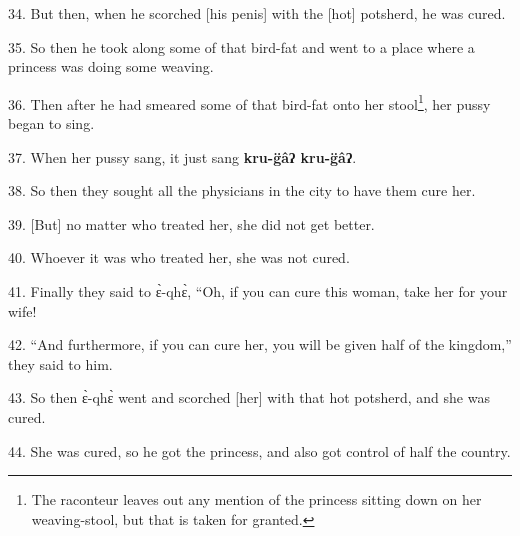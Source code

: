 34. But then, when he scorched [his penis] with the [hot] potsherd, he was cured.

35. So then he took along some of that bird-fat and went to a place where a princess
was doing some weaving.

36. Then after he had smeared some of that bird-fat onto her stool\footnote{The raconteur leaves out any mention of the princess sitting down on her weaving-stool, but that is taken for granted.}, her pussy
began to sing.

37. When her pussy sang, it just sang \textbf{kru-g̈âʔ kru-g̈âʔ}.

38. So then they sought all the physicians in the city to have them cure her.

39. [But] no matter who treated her, she did not get better.

40. Whoever it was who treated her, she was not cured.

41. Finally they said to ɛ̀-qhɛ̀, ``Oh, if you can cure this woman, take her
for your wife!

42. ``And furthermore, if you can cure her, you will be given half of the kingdom,''
they said to him.

43. So then ɛ̀-qhɛ̀ went and scorched [her] with that hot potsherd, and she
was cured.

44. She was cured, so he got the princess, and also got control of half the country.

